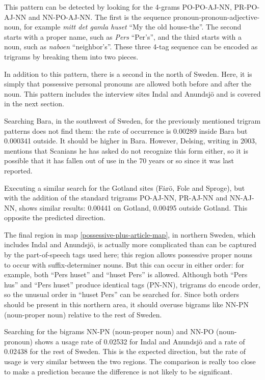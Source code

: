 This pattern can be detected by looking for the
4-grams PO-PO-AJ-NN, PR-PO-AJ-NN and NN-PO-AJ-NN. The first is the
sequence pronoun-pronoun-adjective-noun, for example {\it mitt det
  gamla huset} ``My the old house-the''. The second starts with a
proper name, such as {\it Pers} ``Per's'', and the third starts with a
noun, such as {\it naboen} ``neighbor's''. These three 4-tag sequence
can be encoded as trigrams by breaking them into two pieces.

In addition to this pattern, there is a second in the north of
Sweden. Here, it is simply that possessive personal pronouns are
allowed both before and after the noun. This pattern includes the
interview sites Indal and Anundsj\"o and is covered in the next
section.

Searching Bara, in the southwest of Sweden, for the previously
mentioned trigram patterns does not find them: the rate of occurrence
is 0.00289 inside Bara but 0.000341 outside. It should be higher in
Bara. However, Delsing, writing in 2003, mentions that Scanians
he has asked do not recognize this form either, so it is possible that
it has fallen out of use in the 70 years or so since it was last
reported.

Executing a similar search for the Gotland sites (F\.ar\"o, Fole and
Sproge), but with the addition of the standard trigrams PO-AJ-NN,
PR-AJ-NN and NN-AJ-NN, shows similar results: 0.00441 on Gotland,
0.00495 outside Gotland. This opposite the predicted direction.

The final region in map \ref{possessive-plus-article-map}, in northern
Sweden, which includes Indal and Anundsj\"o, is actually more
complicated than can be captured by the part-of-speech tags used here;
this region allows possessive proper nouns to occur with
suffix-determiner nouns. But this can occur in either order: for
example, both ``Pers huset'' and ``huset Pers'' is allowed. Although
both ``Pers hus'' and ``Pers huset'' produce identical tags (PN-NN),
trigrams do encode order, so the unusual order in ``huset Pers'' can be
searched for. Since both orders should be present in this northern
area, it should overuse bigrams like NN-PN (noun-proper noun) relative
to the rest of Sweden.

Searching for the bigrams NN-PN (noun-proper noun) and NN-PO
(noun-pronoun) shows a usage rate of 0.02532 for Indal and Anundsj\"o
and a rate of 0.02438 for the rest of Sweden. This is the expected
direction, but the rate of usage is very similar between the two
regions. The comparison is really too close to make a prediction
because the difference is not likely to be significant.

